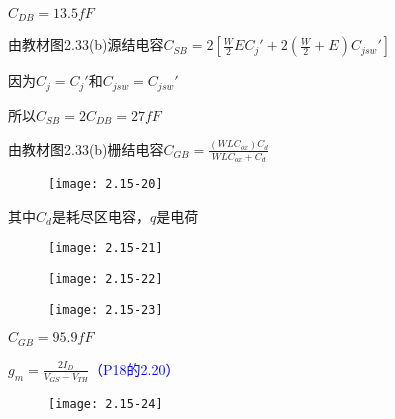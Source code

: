 $C_{DB}=13.5fF$

由教材图2.33(b)源结电容$C_{SB}=2[\frac{W}{2}EC_j'+2(\frac{W}{2}+E)C_{jsw}']$

因为$C_j=C_j'$和$C_{jsw}=C_{jsw}'$

所以$C_{SB}=2C_{DB}=27fF$




由教材图2.33(b)栅结电容$C_{GB}=\frac{(WLC_{ox})C_d}{WLC_{ox}+C_d}$


\begin{figure}[H] %
	\begin{minipage}{\linewidth}
		\texttt{[image: 2.15-20]}
	\end{minipage}
\end{figure}

其中$C_d$是耗尽区电容，$q$是电荷

\begin{figure}[H] %
	\begin{minipage}{\linewidth}
		\texttt{[image: 2.15-21]}
	\end{minipage}
\end{figure}

\begin{figure}[H] %
	\begin{minipage}{\linewidth}
		\texttt{[image: 2.15-22]}
	\end{minipage}
\end{figure}

\begin{figure}[H] %
	\begin{minipage}{\linewidth}
		\texttt{[image: 2.15-23]}
	\end{minipage}
\end{figure}








$C_{GB}=95.9fF$


$g_m=\frac{2I_D}{V_{GS}-V_{TH}}$\textcolor{blue}{（P18的2.20）}

\begin{figure}[H] %
	\begin{minipage}{\linewidth}
		\texttt{[image: 2.15-24]}
	\end{minipage}
\end{figure}








